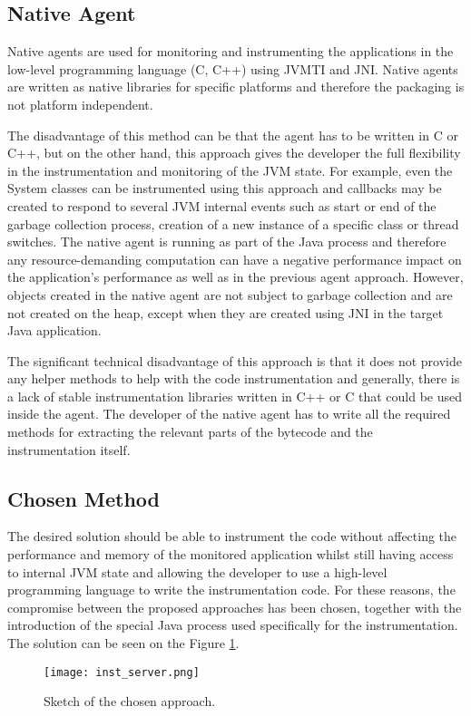 \subsection{Native Agent}
Native agents are used for monitoring and instrumenting the applications in the low-level programming language (C, C++) using JVMTI and JNI. Native agents are written as native libraries for specific platforms and therefore the packaging is not platform independent. 

The disadvantage of this method can be that the agent has to be written in C or C++, but on the other hand, this approach gives the developer the full flexibility in the instrumentation and monitoring of the JVM state. For example, even the System classes can be instrumented using this approach and callbacks may be created to respond to several JVM internal events such as start or end of the garbage collection process, creation of a new instance of a specific class or thread switches. The native agent is running as part of the Java process and therefore any resource-demanding computation can have a negative performance impact on the application's performance as well as in the previous agent approach. However, objects created in the native agent are not subject to garbage collection and are not created on the heap, except when they are created using JNI in the target Java application.

The significant technical disadvantage of this approach is that it does not provide any helper methods to help with the code instrumentation and generally, there is a lack of stable instrumentation libraries written in C++ or C that could be used inside the agent. The developer of the native agent has to write all the required methods for extracting the relevant parts of the bytecode and the instrumentation itself.
\subsection{Chosen Method}
\label{subsec:inst_jvm}
The desired solution should be able to instrument the code without affecting the performance and memory of the monitored application whilst still having access to internal JVM state and allowing the developer to use a high-level programming language to write the instrumentation code. For these reasons, the compromise between the proposed approaches has been chosen, together with the introduction of the special Java process used specifically for the instrumentation. The solution can be seen on the Figure \ref{fig:inst_server_basic}.
\begin{figure}
	\centering
	\texttt{[image: inst\_server.png]}
	\caption{Sketch of the chosen approach.}
	\label{fig:inst_server_basic}
\end{figure}


